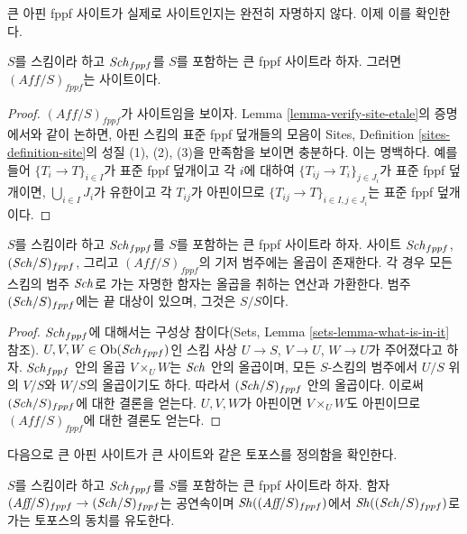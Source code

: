 \noindent
큰 아핀 fppf 사이트가 실제로 사이트인지는 완전히 자명하지 않다.
이제 이를 확인한다.

\begin{lemma}
\label{lemma-verify-site-fppf}
$S$를 스킴이라 하고 $\mathit{Sch}_{fppf}$를 $S$를 포함하는 큰 fppf 사이트라
하자. 그러면 $(\textit{Aff}/S)_{fppf}$는 사이트이다.
\end{lemma}

\begin{proof}
$(\textit{Aff}/S)_{fppf}$가 사이트임을 보이자. Lemma
\ref{lemma-verify-site-etale}의 증명에서와 같이 논하면, 아핀 스킴의 표준
fppf 덮개들의 모음이 Sites, Definition \ref{sites-definition-site}의
성질 (1), (2), (3)을 만족함을 보이면 충분하다. 이는 명백하다. 예를
들어 $\{T_i \to T\}_{i\in I}$가 표준 fppf 덮개이고 각 $i$에 대하여
$\{T_{ij} \to T_i\}_{j\in J_i}$가 표준 fppf 덮개이면,
$\bigcup_{i\in I} J_i$가 유한이고 각 $T_{ij}$가 아핀이므로
$\{T_{ij} \to T\}_{i \in I, j\in J_i}$는 표준 fppf 덮개이다.
\end{proof}

\begin{lemma}
\label{lemma-fibre-products-fppf}
$S$를 스킴이라 하고 $\mathit{Sch}_{fppf}$를 $S$를 포함하는 큰 fppf 사이트라
하자. 사이트 $\mathit{Sch}_{fppf}$, $(\mathit{Sch}/S)_{fppf}$, 그리고
$(\textit{Aff}/S)_{fppf}$의 기저 범주에는 올곱이 존재한다. 각 경우 모든
스킴의 범주 $\mathit{Sch}$로 가는 자명한 함자는 올곱을 취하는 연산과
가환한다. 범주 $(\mathit{Sch}/S)_{fppf}$에는 끝 대상이 있으며, 그것은
$S/S$이다.
\end{lemma}

\begin{proof}
$\mathit{Sch}_{fppf}$에 대해서는 구성상 참이다(Sets, Lemma
\ref{sets-lemma-what-is-in-it} 참조). $U, V, W \in \mathop{\mathrm{Ob}}\nolimits(\mathit{Sch}_{fppf})$인
스킴 사상 $U \to S$, $V \to U$, $W \to U$가 주어졌다고 하자.
$\mathit{Sch}_{fppf}$ 안의 올곱 $V \times_U W$는 $\mathit{Sch}$ 안의 올곱이며, 모든
$S$-스킴의 범주에서 $U/S$ 위의 $V/S$와 $W/S$의 올곱이기도 하다.
따라서 $(\mathit{Sch}/S)_{fppf}$ 안의 올곱이다. 이로써 $(\mathit{Sch}/S)_{fppf}$에
대한 결론을 얻는다. $U, V, W$가 아핀이면 $V \times_U W$도 아핀이므로
$(\textit{Aff}/S)_{fppf}$에 대한 결론도 얻는다.
\end{proof}

\noindent
다음으로 큰 아핀 사이트가 큰 사이트와 같은 토포스를 정의함을
확인한다.

\begin{lemma}
\label{lemma-affine-big-site-fppf}
$S$를 스킴이라 하고 $\mathit{Sch}_{fppf}$를 $S$를 포함하는 큰 fppf 사이트라
하자. 함자 $(\textit{Aff}/S)_{fppf} \to (\mathit{Sch}/S)_{fppf}$는 공연속이며
$\mathop{\mathit{Sh}}\nolimits((\textit{Aff}/S)_{fppf})$에서 $\mathop{\mathit{Sh}}\nolimits((\mathit{Sch}/S)_{fppf})$로 가는
토포스의 동치를 유도한다.
\end{lemma}

